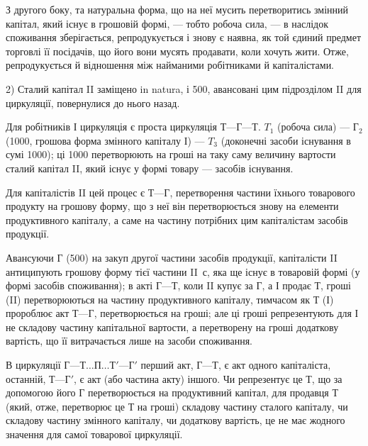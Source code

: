 
З другого боку, та натуральна форма, що на неї мусить перетворитись
змінний капітал, який існує в грошовій формі, — тобто робоча сила, —
в наслідок споживання зберігається, репродукується і знову є наявна,
як той єдиний предмет торговлі її посідачів, що його вони мусять продавати,
коли хочуть жити. Отже, репродукується й відношення між найманими
робітниками й капіталістами.

2) Сталий капітал II заміщено in natura, і 500, авансовані
цим підрозділом II для циркуляції, повернулися до нього назад.

Для робітників І циркуляція є проста циркуляція $Т — Г — Т$. $T_1$ (робоча
сила) — $Г_2$ (1000, грошова форма змінного капіталу І) — $T_3$
(доконечні засоби існування в сумі 1000); ці 1000
перетворюють на гроші на таку саму величину вартости сталий капітал II,
який існує у формі товару — засобів існування.

Для капіталістів II цей процес є $Т — Г$, перетворення частини їхнього
товарового продукту на грошову форму, що з неї він перетворюється
знову на елементи продуктивного капіталу, а саме на частину потрібних
цим капіталістам засобів продукції.

Авансуючи $Г$ (500) на закуп другої частини засобів продукції,
капіталісти II антиципують грошову форму тієї частини II~$с$, яка
ще існує в товаровій формі (у формі засобів споживання); в акті $Г — Т$,
коли II купує за $Г$, а І продає $Т$, гроші (II) перетворюються на частину
продуктивного капіталу, тимчасом як $Т$ (І) пророблює акт $Т — Г$, перетворюється
на гроші; але ці гроші репрезентують для І не складову частину
капітальної вартости, а перетворену на гроші додаткову вартість, що її
витрачається лише на засоби споживання.

В циркуляції $Г — Т\dots{} П\dots{} Т' — Г'$ перший акт, $Г — Т$, є акт одного капіталіста,
останній, $Т — Г'$, є акт (або частина акту) іншого. Чи репрезентує
це $Т$, що за допомогою його $Г$ перетворюється на продуктивний капітал,
для продавця $Т$ (який, отже, перетворює це $Т$ на гроші) складову частину
сталого капіталу, чи складову частину змінного капіталу, чи додаткову
вартість, це не має жодного значення для самої товарової циркуляції.

